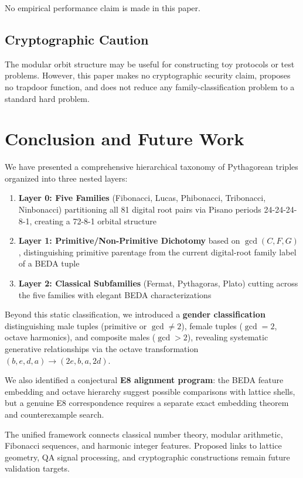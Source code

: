 \documentclass[12pt]{article}
\begin{document}
No empirical performance claim is made in this paper.

\subsection{Cryptographic Caution}

The modular orbit structure may be useful for constructing toy protocols or test problems. However, this paper makes no cryptographic security claim, proposes no trapdoor function, and does not reduce any family-classification problem to a standard hard problem.

\section{Conclusion and Future Work}

We have presented a comprehensive hierarchical taxonomy of Pythagorean triples organized into three nested layers:

\begin{enumerate}
\item \textbf{Layer 0: Five Families} (Fibonacci, Lucas, Phibonacci, Tribonacci, Ninbonacci) partitioning all 81 digital root pairs via Pisano periods 24-24-24-8-1, creating a 72-8-1 orbital structure
\item \textbf{Layer 1: Primitive/Non-Primitive Dichotomy} based on $\gcd(C,F,G)$, distinguishing primitive parentage from the current digital-root family label of a BEDA tuple
\item \textbf{Layer 2: Classical Subfamilies} (Fermat, Pythagoras, Plato) cutting across the five families with elegant BEDA characterizations
\end{enumerate}

Beyond this static classification, we introduced a \textbf{gender classification} distinguishing male tuples (primitive or $\gcd \neq 2$), female tuples ($\gcd = 2$, octave harmonics), and composite males ($\gcd > 2$), revealing systematic generative relationships via the octave transformation $(b,e,d,a) \to (2e, b, a, 2d)$.

We also identified a conjectural \textbf{E8 alignment program}: the BEDA feature embedding and octave hierarchy suggest possible comparisons with lattice shells, but a genuine E8 correspondence requires a separate exact embedding theorem and counterexample search.

The unified framework connects classical number theory, modular arithmetic, Fibonacci sequences, and harmonic integer features. Proposed links to lattice geometry, QA signal processing, and cryptographic constructions remain future validation targets.
\end{document}
